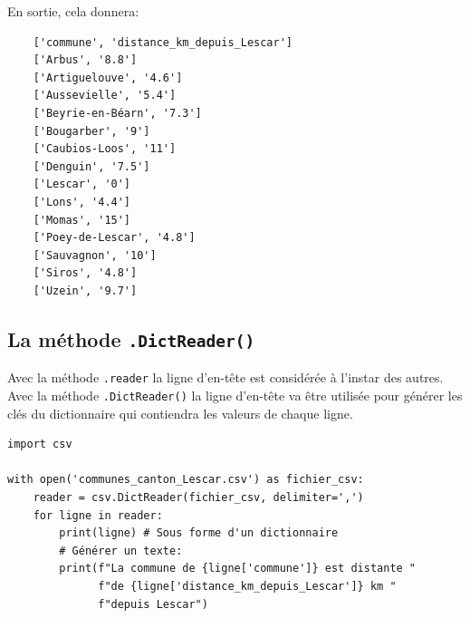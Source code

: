 \documentclass[a4paper,11pt]{book}
\begin{document}
En sortie, cela donnera:
\begin{verbatim}
    ['commune', 'distance_km_depuis_Lescar']
    ['Arbus', '8.8']
    ['Artiguelouve', '4.6']
    ['Aussevielle', '5.4']
    ['Beyrie-en-Béarn', '7.3']
    ['Bougarber', '9']
    ['Caubios-Loos', '11']
    ['Denguin', '7.5']
    ['Lescar', '0']
    ['Lons', '4.4']
    ['Momas', '15']
    ['Poey-de-Lescar', '4.8']
    ['Sauvagnon', '10']
    ['Siros', '4.8']
    ['Uzein', '9.7']
\end{verbatim}
\medskip

\subsection*{La méthode \texttt{.DictReader()}}
Avec la méthode \texttt{.reader} la ligne d'en-tête est considérée à l'instar des autres. Avec la méthode \texttt{.DictReader()} la ligne d'en-tête va être utilisée pour générer les clés du dictionnaire qui contiendra les valeurs de chaque ligne.
\medskip

\begin{lstlisting}[caption=La méthode \texttt{.DictReader()}]
import csv

with open('communes_canton_Lescar.csv') as fichier_csv:
    reader = csv.DictReader(fichier_csv, delimiter=',')
    for ligne in reader:
        print(ligne) # Sous forme d'un dictionnaire
        # Générer un texte:
        print(f"La commune de {ligne['commune']} est distante "
              f"de {ligne['distance_km_depuis_Lescar']} km "
              f"depuis Lescar")
\end{lstlisting}
\medskip
\end{document}
